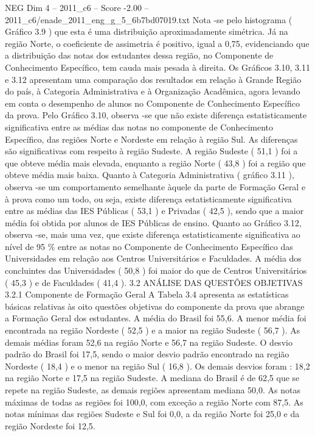 \begin{textsample}{NEG Dim 4 – 2011\_c6 – Score -2.00 – 2011\_c6/enade\_2011\_eng\_g\_5\_6b7bd07019.txt}
Nota -se pelo histograma ( Gráfico 3.9 ) que esta é uma distribuição aproximadamente simétrica.
Já na região Norte, o coeficiente de assimetria é positivo, igual a 0,75, evidenciando que a distribuição das notas dos estudantes dessa região, no Componente de Conhecimento Específico, tem cauda mais pesada à direita.
Os Gráficos 3.10, 3.11 e 3.12 apresentam uma comparação dos resultados em relação à Grande Região do país, à Categoria Administrativa e à Organização Acadêmica, agora levando em conta o desempenho de alunos no Componente de Conhecimento Específico da prova.
Pelo Gráfico 3.10, observa -se que não existe diferença estatisticamente significativa entre as médias das notas no componente de Conhecimento Específico, das regiões Norte e Nordeste em relação à região Sul.
As diferenças são significativas com respeito à região Sudeste.
A região Sudeste ( 51,1 ) foi a que obteve média mais elevada, enquanto a região Norte ( 43,8 ) foi a região que obteve média mais baixa.
Quanto à Categoria Administrativa ( gráfico 3.11 ), observa -se um comportamento semelhante àquele da parte de Formação Geral e à prova como um todo, ou seja, existe diferença estatisticamente significativa entre as médias das IES Públicas ( 53,1 ) e Privadas ( 42,5 ), sendo que a maior média foi obtida por alunos de IES Públicas de ensino.
Quanto ao Gráfico 3.12, observa -se, mais uma vez, que existe diferença estatisticamente significativa ao nível de 95 \% entre as notas no Componente de Conhecimento Específico das Universidades em relação aos Centros Universitários e Faculdades.
A média dos concluintes das Universidades ( 50,8 ) foi maior do que de Centros Universitários ( 45,3 ) e de Faculdades ( 41,4 ). 3.2 ANÁLISE DAS QUESTÕES OBJETIVAS 3.2.1 Componente de Formação Geral A Tabela 3.4 apresenta as estatísticas básicas relativas às oito questões objetivas do componente da prova que abrange a Formação Geral dos estudantes.
A média do Brasil foi 55,6.
A menor média foi encontrada na região Nordeste ( 52,5 ) e a maior na região Sudeste ( 56,7 ).
As demais médias foram 52,6 na região Norte e 56,7 na região Sudeste.
O desvio padrão do Brasil foi 17,5, sendo o maior desvio padrão encontrado na região Nordeste ( 18,4 ) e o menor na região Sul ( 16,8 ).
Os demais desvios foram : 18,2 na região Norte e 17,5 na região Sudeste.
A mediana do Brasil é de 62,5 que se repete na região Sudeste, as demais regiões apresentam mediana 50,0.
As notas máximas de todas as regiões foi 100,0, com exceção a região Norte com 87,5.
As notas mínimas das regiões Sudeste e Sul foi 0,0, a da região Norte foi 25,0 e da região Nordeste foi 12,5.

\end{textsample}
